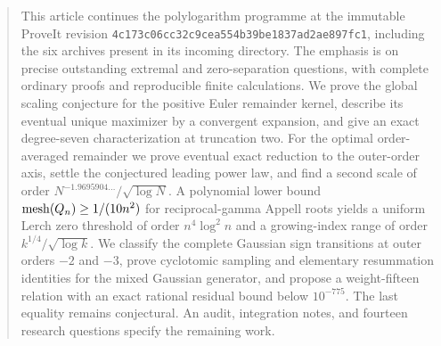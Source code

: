 \begin{abstract}
This article continues the polylogarithm programme at the immutable
ProveIt revision \texttt{4c173c06cc32c9cea554b39be1837ad2ae897fc1},
including the six archives present in its incoming directory. The emphasis
is on precise outstanding extremal and zero-separation questions, with
complete ordinary proofs and reproducible finite calculations. We prove
the global scaling conjecture for the positive Euler remainder kernel,
describe its eventual unique maximizer by a convergent expansion, and
give an exact degree-seven characterization at truncation two.
For the optimal order-averaged remainder we prove eventual exact
reduction to the outer-order axis, settle the conjectured leading
power law, and find a second scale of order
$N^{-1.9695904\ldots}/\sqrt{\log N}$.
A polynomial lower bound $\mesh(Q_n)\ge1/(10n^2)$ for reciprocal-gamma
Appell roots yields a uniform Lerch zero threshold of order
$n^4\log^2 n$ and a growing-index range of order
$k^{1/4}/\sqrt{\log k}$.
We classify the complete Gaussian sign transitions at outer orders
$-2$ and $-3$, prove cyclotomic sampling and elementary resummation
identities for the mixed Gaussian generator, and propose a weight-fifteen
relation with an exact rational residual bound below $10^{-775}$.
The last equality remains conjectural. An audit, integration notes,
and fourteen research questions specify the remaining work.
\end{abstract}
